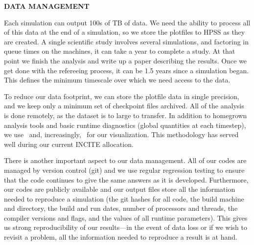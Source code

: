 \documentclass[11pt,letterpaper,english]{article}
\begin{document}

\pagestyle{fancy} 
 \renewcommand{%
\headrulewidth}{0.0pt}


\begin{center}
\bf {DATA MANAGEMENT}
\end{center}





Each simulation can output 100s of TB of data.  We need the ability to
process all of this data at the end of a simulation, so we store the
plotfiles to HPSS as they are created.  A single scientific study
involves several simulations, and factoring in queue times on the
machines, it can take a year to complete a study.  At that point we
finish the analysis and write up a paper describing the results.  Once
we get done with the refereeing process, it can be 1.5 years since a
simulation began.  This defines the minimum timescale over which we
need access to the data.


To reduce our data footprint, we can store the plotfile data in single
precision, and we keep only a minimum set of checkpoint files
archived.  All of the analysis is done remotely, as the dataset is to
large to transfer.  In addition to homegrown analysis tools and basic
runtime diagnostics (global quantities at each timestep), we use
\visit\ and, increasingly, \yt\ for our visualization.  This methodology
has served well during our current INCITE allocation.

There is another important aspect to our data management.  All of our
codes are managed by version control (git) and we use regular
regression testing to ensure that the code continues to give the same
answers as it is developed.  Furthermore, our codes are publicly
available and our output files store all the information needed to
reproduce a simulation (the git hashes for all code, the build machine
and directory, the build and run dates, number of processors and
threads, the compiler versions and flags, and the values of all
runtime parameters).  This gives us strong reproducibility of our
results---in the event of data loss or if we wish to revisit a
problem, all the information needed to reproduce a result is at hand.
\end{document}

